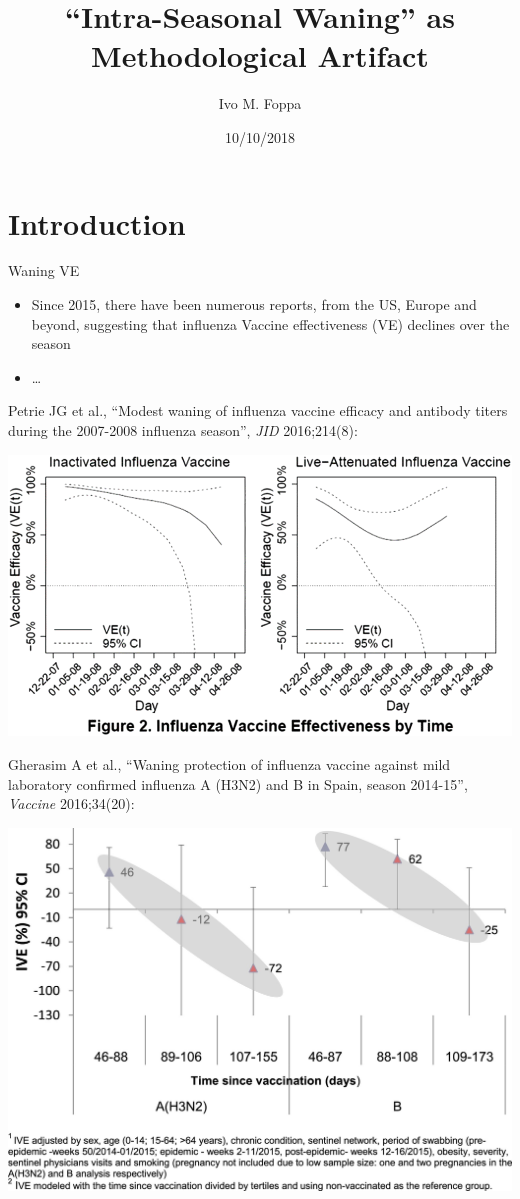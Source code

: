 \documentclass{beamer}
\title[Waning] %
{``Intra-Seasonal Waning'' as Methodological Artifact}
\date{10/10/2018}
\author{Ivo M. Foppa}
\begin{document}
%
	\begin{frame}
	\titlepage
	\end{frame}
%
%
\section{Introduction}
\begin{frame}{Waning VE}
\footnotesize
%
\begin{itemize}
\item Since 2015, there have been numerous reports, from the US, Europe and beyond, suggesting that influenza Vaccine effectiveness (VE) declines over the season
\item \ldots
\end{itemize}
\end{frame}	
%

\begin{frame}
%
Petrie JG et al., ``Modest waning of influenza vaccine efficacy and antibody titers during the 2007-2008 influenza season'', \textit{JID} 2016;214(8):
\bigskip

\centering
\includegraphics[width=.8\textwidth]{Petrie_waning}

\end{frame}	
%
\begin{frame}
%
Gherasim A et al., ``Waning protection of influenza vaccine against mild laboratory confirmed influenza A (H3N2) and B in Spain, season 2014-15'', \textit{Vaccine} 2016;34(20):
\bigskip

\centering
\includegraphics[width=.6\textwidth]{Spain_waning}

\end{frame}	
%
\end{document}
